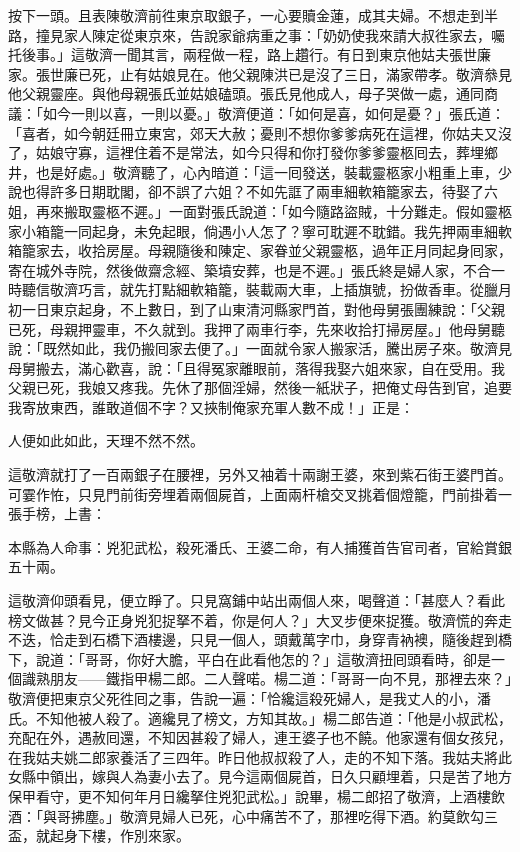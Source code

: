 按下一頭。且表陳敬濟前徃東京取銀子，一心要贖金蓮，成其夫婦。不想走到半路，撞見家人陳定從東京來，告說家爺病重之事：「奶奶使我來請大叔徃家去，囑托後事。」這敬濟一聞其言，兩程做一程，路上趲行。有日到東京他姑夫張世廉家。張世廉已死，止有姑娘見在。他父親陳洪已是沒了三日，滿家帶孝。敬濟叅見他父親靈座。與他母親張氏並姑娘磕頭。張氏見他成人，母子哭做一處，通同商議：「如今一則以喜，一則以憂。」{}敬濟便道：「如何是喜，如何是憂？」張氏道：「喜者，如今朝廷冊立東宮，郊天大赦；憂則不想你爹爹病死在這裡，你姑夫又沒了，姑娘守寡，這裡住着不是常法，如今只得和你打發你爹爹靈柩囘去，葬埋鄉井，也是好處。」敬濟聽了，心內暗道：「這一囘發送，裝載靈柩家小粗重上車，少說也得許多日期耽閣，卻不誤了六姐？{}不如先誆了兩車細軟箱籠家去，待娶了六姐，再來搬取靈柩不遲。」一面對張氏說道：「如今隨路盜賊，十分難走。假如靈柩家小箱籠一同起身，未免起眼，倘遇小人怎了？寧可耽遲不耽錯。我先押兩車細軟箱籠家去，收拾房屋。母親隨後和陳定、家眷並父親靈柩，過年正月同起身囘家，寄在城外寺院，然後做齋念經、築墳安葬，也是不遲。」張氏終是婦人家，不合一時聽信敬濟巧言，就先打點細軟箱籠，裝載兩大車，上插旗號，扮做香車。從臘月初一日東京起身，不上數日，到了山東清河縣家門首，對他母舅張團練說：「父親已死，母親押靈車，不久就到。我押了兩車行李，先來收拾打掃房屋。」他母舅聽說：「既然如此，我仍搬囘家去便了。」一面就令家人搬家活，騰出房子來。敬濟見母舅搬去，滿心歡喜，說：「且得冤家離眼前，落得我娶六姐來家，自在受用。我父親已死，我娘又疼我。先休了那個淫婦，然後一紙狀子，把俺丈母告到官，追要我寄放東西，誰敢道個不字？{}又挾制俺家充軍人數不成！」正是：

\begin{myquote}
人便如此如此，天理不然不然。
\end{myquote}

這敬濟就打了一百兩銀子在腰裡，另外又袖着十兩謝王婆，來到紫石街王婆門首。可霎作恠，只見門前街旁埋着兩個屍首，上面兩杆槍交叉挑着個燈籠，門前掛着一張手榜，上書：

\begin{myquote}[\markfont]
本縣為人命事：兇犯武松，殺死潘氏、王婆二命，有人捕獲首告官司者，官給賞銀五十兩。
\end{myquote}

這敬濟仰頭看見，便立睜了。只見窩鋪中站出兩個人來，喝聲道：「甚麼人？看此榜文做甚？見今正身兇犯捉拏不着，你是何人？」大叉步便來捉獲。敬濟慌的奔走不迭，恰走到石橋下酒樓邊，只見一個人，頭戴萬字巾，身穿青衲襖，隨後趕到橋下，說道：「哥哥，你好大膽，平白在此看他怎的？」這敬濟扭囘頭看時，卻是一個識熟朋友——鐵指甲楊二郎。二人聲喏。楊二道：「哥哥一向不見，那裡去來？」敬濟便把東京父死徃囘之事，告說一遍：「恰纔這殺死婦人，是我丈人的小，潘氏。不知他被人殺了。適纔見了榜文，方知其故。」楊二郎告道：「他是小叔武松，充配在外，遇赦囘還，不知因甚殺了婦人，連王婆子也不饒。他家還有個女孩兒，在我姑夫姚二郎家養活了三四年。昨日他叔叔殺了人，走的不知下落。我姑夫將此女縣中領出，嫁與人為妻小去了。{}見今這兩個屍首，日久只顧埋着，只是苦了地方保甲看守，更不知何年月日纔拏住兇犯武松。」說畢，楊二郎招了敬濟，上酒樓飲酒：「與哥拂塵。」敬濟見婦人已死，心中痛苦不了，那裡吃得下酒。約莫飲勾三盃，就起身下樓，作別來家。


